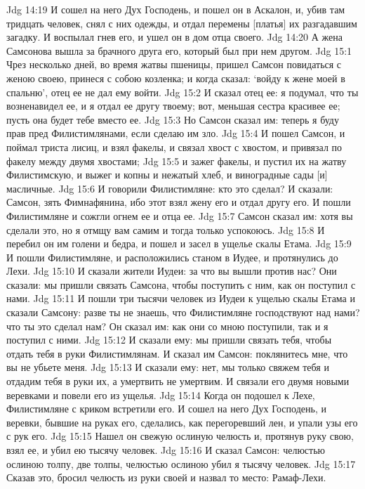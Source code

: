 Jdg 14:19  И сошел на него Дух Господень, и пошел он в Аскалон, и, убив там тридцать человек, снял с них одежды, и отдал перемены [платья] их разгадавшим загадку. И воспылал гнев его, и ушел он в дом отца своего.
Jdg 14:20  А жена Самсонова вышла за брачного друга его, который был при нем другом.
Jdg 15:1  Чрез несколько дней, во время жатвы пшеницы, пришел Самсон повидаться с женою своею, принеся с собою козленка; и когда сказал: `войду к жене моей в спальню', отец ее не дал ему войти.
Jdg 15:2  И сказал отец ее: я подумал, что ты возненавидел ее, и я отдал ее другу твоему; вот, меньшая сестра красивее ее; пусть она будет тебе вместо ее.
Jdg 15:3  Но Самсон сказал им: теперь я буду прав пред Филистимлянами, если сделаю им зло.
Jdg 15:4  И пошел Самсон, и поймал триста лисиц, и взял факелы, и связал хвост с хвостом, и привязал по факелу между двумя хвостами;
Jdg 15:5  и зажег факелы, и пустил их на жатву Филистимскую, и выжег и копны и нежатый хлеб, и виноградные сады [и] масличные.
Jdg 15:6  И говорили Филистимляне: кто это сделал? И сказали: Самсон, зять Фимнафянина, ибо этот взял жену его и отдал другу его. И пошли Филистимляне и сожгли огнем ее и отца ее.
Jdg 15:7  Самсон сказал им: хотя вы сделали это, но я отмщу вам самим и тогда только успокоюсь.
Jdg 15:8  И перебил он им голени и бедра, и пошел и засел в ущелье скалы Етама.
Jdg 15:9  И пошли Филистимляне, и расположились станом в Иудее, и протянулись до Лехи.
Jdg 15:10  И сказали жители Иудеи: за что вы вышли против нас? Они сказали: мы пришли связать Самсона, чтобы поступить с ним, как он поступил с нами.
Jdg 15:11  И пошли три тысячи человек из Иудеи к ущелью скалы Етама и сказали Самсону: разве ты не знаешь, что Филистимляне господствуют над нами? что ты это сделал нам? Он сказал им: как они со мною поступили, так и я поступил с ними.
Jdg 15:12  И сказали ему: мы пришли связать тебя, чтобы отдать тебя в руки Филистимлянам. И сказал им Самсон: поклянитесь мне, что вы не убьете меня.
Jdg 15:13  И сказали ему: нет, мы только свяжем тебя и отдадим тебя в руки их, а умертвить не умертвим. И связали его двумя новыми веревками и повели его из ущелья.
Jdg 15:14  Когда он подошел к Лехе, Филистимляне с криком встретили его. И сошел на него Дух Господень, и веревки, бывшие на руках его, сделались, как перегоревший лен, и упали узы его с рук его.
Jdg 15:15  Нашел он свежую ослиную челюсть и, протянув руку свою, взял ее, и убил ею тысячу человек.
Jdg 15:16  И сказал Самсон: челюстью ослиною толпу, две толпы, челюстью ослиною убил я тысячу человек.
Jdg 15:17  Сказав это, бросил челюсть из руки своей и назвал то место: Рамаф-Лехи.
